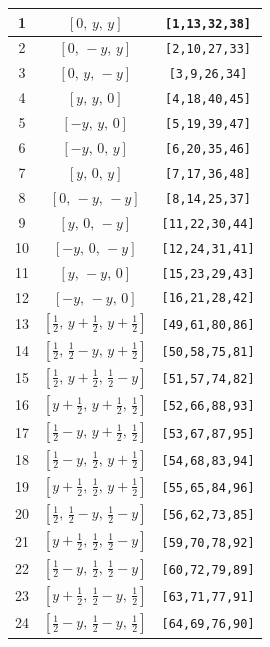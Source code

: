 \documentclass[fleqn,8pt]{jsarticle}
\begin{document}
\begin{longtable}{ccc}
1 & $\left[ 0,\, y,\, y \right]$ & {\tt [1,13,32,38]} \\ \hline
2 & $\left[ 0,\, - y,\, y \right]$ & {\tt [2,10,27,33]} \\ \hline
3 & $\left[ 0,\, y,\, - y \right]$ & {\tt [3,9,26,34]} \\ \hline
4 & $\left[ y,\, y,\, 0 \right]$ & {\tt [4,18,40,45]} \\ \hline
5 & $\left[ - y,\, y,\, 0 \right]$ & {\tt [5,19,39,47]} \\ \hline
6 & $\left[ - y,\, 0,\, y \right]$ & {\tt [6,20,35,46]} \\ \hline
7 & $\left[ y,\, 0,\, y \right]$ & {\tt [7,17,36,48]} \\ \hline
8 & $\left[ 0,\, - y,\, - y \right]$ & {\tt [8,14,25,37]} \\ \hline
9 & $\left[ y,\, 0,\, - y \right]$ & {\tt [11,22,30,44]} \\ \hline
10 & $\left[ - y,\, 0,\, - y \right]$ & {\tt [12,24,31,41]} \\ \hline
11 & $\left[ y,\, - y,\, 0 \right]$ & {\tt [15,23,29,43]} \\ \hline
12 & $\left[ - y,\, - y,\, 0 \right]$ & {\tt [16,21,28,42]} \\ \hline
13 & $\left[ \frac{1}{2},\, y + \frac{1}{2},\, y + \frac{1}{2} \right]$ & {\tt [49,61,80,86]} \\ \hline
14 & $\left[ \frac{1}{2},\, \frac{1}{2} - y,\, y + \frac{1}{2} \right]$ & {\tt [50,58,75,81]} \\ \hline
15 & $\left[ \frac{1}{2},\, y + \frac{1}{2},\, \frac{1}{2} - y \right]$ & {\tt [51,57,74,82]} \\ \hline
16 & $\left[ y + \frac{1}{2},\, y + \frac{1}{2},\, \frac{1}{2} \right]$ & {\tt [52,66,88,93]} \\ \hline
17 & $\left[ \frac{1}{2} - y,\, y + \frac{1}{2},\, \frac{1}{2} \right]$ & {\tt [53,67,87,95]} \\ \hline
18 & $\left[ \frac{1}{2} - y,\, \frac{1}{2},\, y + \frac{1}{2} \right]$ & {\tt [54,68,83,94]} \\ \hline
19 & $\left[ y + \frac{1}{2},\, \frac{1}{2},\, y + \frac{1}{2} \right]$ & {\tt [55,65,84,96]} \\ \hline
20 & $\left[ \frac{1}{2},\, \frac{1}{2} - y,\, \frac{1}{2} - y \right]$ & {\tt [56,62,73,85]} \\ \hline
21 & $\left[ y + \frac{1}{2},\, \frac{1}{2},\, \frac{1}{2} - y \right]$ & {\tt [59,70,78,92]} \\ \hline
22 & $\left[ \frac{1}{2} - y,\, \frac{1}{2},\, \frac{1}{2} - y \right]$ & {\tt [60,72,79,89]} \\ \hline
23 & $\left[ y + \frac{1}{2},\, \frac{1}{2} - y,\, \frac{1}{2} \right]$ & {\tt [63,71,77,91]} \\ \hline
24 & $\left[ \frac{1}{2} - y,\, \frac{1}{2} - y,\, \frac{1}{2} \right]$ & {\tt [64,69,76,90]} \\
\end{longtable}
\end{document}
